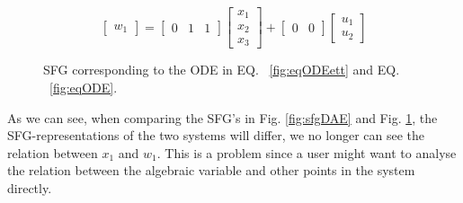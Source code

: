 \begin{equation}\left[ \begin{array}{c} w_1  \end{array} \right]
=  \begin{bmatrix} 0 & 1 & 1\end{bmatrix} \left[ \begin{array}{c} x_1 \\ x_2 \\ x_3 \end{array} \right] + \begin{bmatrix} 0 & 0 \end{bmatrix}  \left[ \begin{array}{c} u_1 \\ u_2 \end{array} \right]
\label{fig:eqODE}
\end{equation}
\begin{figure}
\caption{SFG corresponding to the ODE in EQ. ~\ref{fig:eqODEett} and EQ. ~\ref{fig:eqODE}.}
\label{fig:sfgODE}
\end{figure}%
As we can see, when comparing the SFG's in Fig. \ref{fig:sfgDAE} and Fig. \ref{fig:sfgODE}, the SFG-representations of the two systems will differ, we no longer can see the relation between $x_1$ and $w_1$. This is a problem since a user might want to analyse the relation between the algebraic variable and other points in the system directly.

